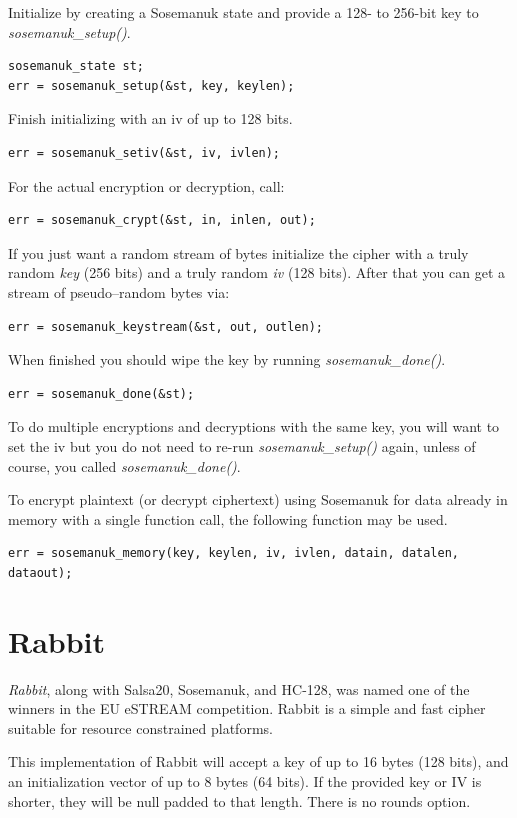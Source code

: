 \documentclass[synpaper]{book}
\newcommand{\mysection}[1]    %
	{                   %
	\section{#1}
   \markboth{\textsf{www.libtom.net}}{\thesection ~ {#1}}
	}
\begin{document}
Initialize by creating a Sosemanuk state and provide a 128- to 256-bit key to \textit{sosemanuk\_setup()}.
\begin{verbatim}
sosemanuk_state st;
err = sosemanuk_setup(&st, key, keylen);
\end{verbatim}

Finish initializing with an iv of up to 128 bits.
\begin{verbatim}
err = sosemanuk_setiv(&st, iv, ivlen);
\end{verbatim}

For the actual encryption or decryption, call:
\begin{verbatim}
err = sosemanuk_crypt(&st, in, inlen, out);
\end{verbatim}

If you just want a random stream of bytes initialize the cipher with a truly random
\textit{key} (256 bits) and a truly random \textit{iv} (128 bits). After that you can
get a stream of pseudo--random bytes via:
\begin{verbatim}
err = sosemanuk_keystream(&st, out, outlen);
\end{verbatim}

When finished you should wipe the key by running \textit{sosemanuk\_done()}.
\begin{verbatim}
err = sosemanuk_done(&st);
\end{verbatim}

To do multiple encryptions and decryptions with the same key, you will want to set the iv but
you do not need to re-run \textit{sosemanuk\_setup()} again, unless of course, you called
\textit{sosemanuk\_done()}.

To encrypt plaintext (or decrypt ciphertext) using Sosemanuk for data already in
memory with a single function call, the following function may be used.
\begin{verbatim}
err = sosemanuk_memory(key, keylen, iv, ivlen, datain, datalen, dataout);
\end{verbatim}

\mysection{Rabbit}

\textit{Rabbit}, along with Salsa20, Sosemanuk, and HC-128, was named one of the winners
in the EU eSTREAM competition.  Rabbit is a simple and fast cipher suitable for resource
constrained platforms.

This implementation of Rabbit will accept a key of up to 16 bytes (128 bits), and an
initialization vector of up to 8 bytes (64 bits).  If the provided key or IV is shorter,
they will be null padded to that length.  There is no rounds option.
\end{document}
